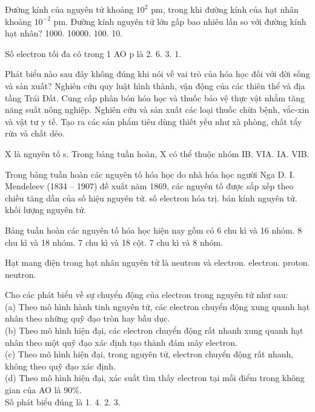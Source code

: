 \documentclass[11pt,a4paper]{article}
\begin{document}
\begin{ex}
Đường kính của nguyên tử khoảng $10^2\text{ pm}$, trong khi đường kính của hạt nhân khoảng $10^{-2}\text{ pm}$. Đường kính nguyên tử lớn gấp bao nhiêu lần so với đường kính hạt nhân?
\choice
{1000.}
{10000.}
{100.}
{10.}
\end{ex}
\begin{ex}
Số electron tối đa có trong 1 AO p là
\choice
{2.}
{6.}
{3.}
{1.}
\end{ex}
\begin{ex}
Phát biểu nào sau đây không đúng khi nói về vai trò của hóa học đối với đời sống và sản xuất?
\choice
{Nghiên cứu quy luật hình thành, vận động của các thiên thể và địa tầng Trái Đất.}
{Cung cấp phân bón hóa học và thuốc bảo vệ thực vật nhằm tăng năng suất nông nghiệp.}
{Nghiên cứu và sản xuất các loại thuốc chữa bệnh, vắc-xin và vật tư y tế.}
{Tạo ra các sản phẩm tiêu dùng thiết yếu như xà phòng, chất tẩy rửa và chất dẻo.}
\end{ex}
\begin{ex}
X là nguyên tố s. Trong bảng tuần hoàn, X có thể thuộc nhóm
\choice
{IB.}
{VIA.}
{IA.}
{VIB.}
\end{ex}
\begin{ex}
Trong bảng tuần hoàn các nguyên tố hóa học do nhà hóa học người Nga D. I. Mendeleev (1834 -- 1907) đề xuất năm 1869, các nguyên tố được sắp xếp theo chiều tăng dần của
\choice
{số hiệu nguyên tử.}
{số electron hóa trị.}
{bán kính nguyên tử.}
{khối lượng nguyên tử.}
\end{ex}
\begin{ex}
Bảng tuần hoàn các nguyên tố hóa học hiện nay gồm có
\choice
{6 chu kì và 16 nhóm.}
{8 chu kì và 18 nhóm.}
{7 chu kì và 18 cột.}
{7 chu kì và 8 nhóm.}
\end{ex}
\begin{ex}
Hạt mang điện trong hạt nhân nguyên tử là
\choice
{neutron và electron.}
{electron.}
{proton.}
{neutron.}
\end{ex}
\begin{ex}
Cho các phát biểu về sự chuyển động của electron trong nguyên tử như sau:\\
(a) Theo mô hình hành tinh nguyên tử, các electron chuyển động xung quanh hạt nhân theo những quỹ đạo tròn hay bầu dục.\\
(b) Theo mô hình hiện đại, các electron chuyển động rất nhanh xung quanh hạt nhân theo một quỹ đạo xác định tạo thành đám mây electron.\\
(c) Theo mô hình hiện đại, trong nguyên tử, electron chuyển động rất nhanh, không theo quỹ đạo xác định.\\
(d) Theo mô hình hiện đại, xác suất tìm thấy electron tại mỗi điểm trong không gian của AO là 90\%.\\
Số phát biểu đúng là
\choice
{1.}
{4.}
{2.}
{3.}
\end{ex}
\end{document}
